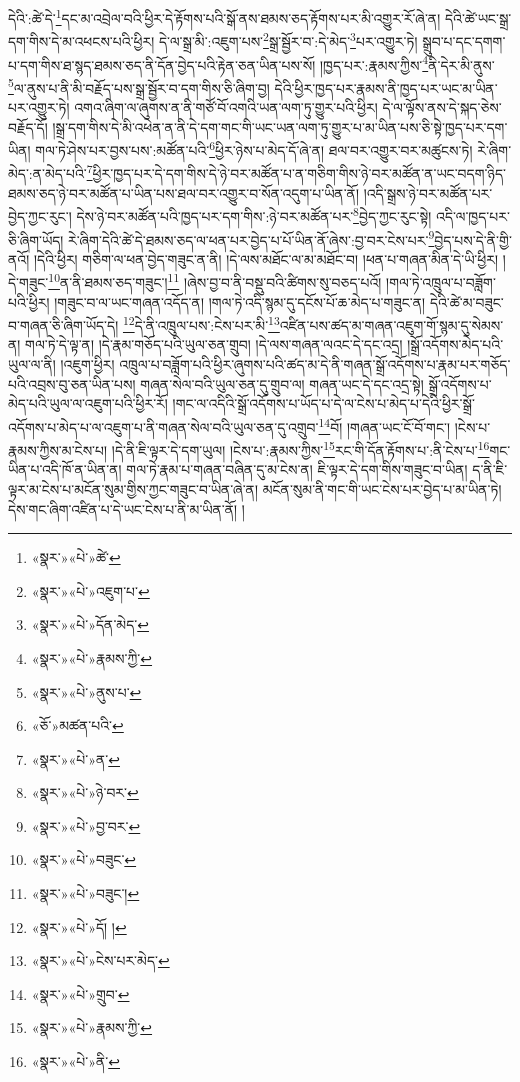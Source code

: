 དེའི་:ཚེ་དེ་\footnote{«སྣར་»«པེ་»ཚེ་}དང་མ་འབྲེལ་བའི་ཕྱིར་དེ་རྟོགས་པའི་སྒོ་ནས་ཐམས་ཅད་རྟོགས་པར་མི་འགྱུར་རོ་ཞེ་ན། དེའི་ཚེ་ཡང་སྒྲ་དག་གིས་དེ་མ་འཕངས་པའི་ཕྱིར། དེ་ལ་སྒྲ་མི་:འཇུག་པས་\footnote{«སྣར་»«པེ་»འཇུག་པ་}སྒྲ་སྦྱོར་བ་:དེ་མེད་\footnote{«སྣར་»«པེ་»དོན་མེད་}པར་འགྱུར་ཏེ། སྒྲུབ་པ་དང་དགག་པ་དག་གིས་ཐ་སྙད་ཐམས་ཅད་ནི་དོན་བྱེད་པའི་རྟེན་ཅན་ཡིན་པས་སོ། །ཁྱད་པར་:རྣམས་ཀྱིས་\footnote{«སྣར་»«པེ་»རྣམས་ཀྱི་}ནི་དེར་མི་ནུས་\footnote{«སྣར་»«པེ་»ནུས་པ་}ལ་ནུས་པ་ནི་མི་བརྗོད་པས་སྒྲ་སྦྱོར་བ་དག་གིས་ཅི་ཞིག་བྱ། དེའི་ཕྱིར་ཁྱད་པར་རྣམས་ནི་ཁྱད་པར་ཡང་མ་ཡིན་པར་འགྱུར་ཏེ། འགའ་ཞིག་ལ་ཞུགས་ན་ནི་གཙོ་བོ་འགའི་ཡན་ལག་ཏུ་གྱུར་པའི་ཕྱིར། དེ་ལ་ལྟོས་ནས་དེ་སྐད་ཅེས་བརྗོད་དོ། །སྒྲ་དག་གིས་དེ་མི་འཕེན་ན་ནི་དེ་དག་གང་གི་ཡང་ཡན་ལག་ཏུ་གྱུར་པ་མ་ཡིན་པས་ཅི་སྟེ་ཁྱད་པར་དག་ཡིན། གལ་ཏེ་ཤེས་པར་བྱས་པས་:མཚོན་པའི་\footnote{«ཅོ་»མཚན་པའི་}ཕྱིར་ཉེས་པ་མེད་དོ་ཞེ་ན། ཐལ་བར་འགྱུར་བར་མཚུངས་ཏེ། རེ་ཞིག་མེད་:ན་མེད་པའི་\footnote{«སྣར་»«པེ་»ན་}ཕྱིར་ཁྱད་པར་དེ་དག་གིས་དེ་ཉེ་བར་མཚོན་པ་ན་གཅིག་གིས་ཉེ་བར་མཚོན་ན་ཡང་བདག་ཉིད་ཐམས་ཅད་ཉེ་བར་མཚོན་པ་ཡིན་པས་ཐལ་བར་འགྱུར་བ་སོན་འདུག་པ་ཡིན་ནོ། །འདི་སྒྲས་ཉེ་བར་མཚོན་པར་བྱེད་ཀྱང་རུང་། དེས་ཉེ་བར་མཚོན་པའི་ཁྱད་པར་དག་གིས་:ཉེ་བར་མཚོན་པར་\footnote{«སྣར་»«པེ་»ཉེ་བར་}བྱེད་ཀྱང་རུང་སྟེ། འདི་ལ་ཁྱད་པར་ཅི་ཞིག་ཡོད། རེ་ཞིག་དེའི་ཚེ་དེ་ཐམས་ཅད་ལ་ཕན་པར་བྱེད་པ་པོ་ཡིན་ནོ་ཞེས་:བྱ་བར་ངེས་པར་\footnote{«སྣར་»«པེ་»བྱ་བར་}བྱེད་པས་དེ་ནི་གྱི་ནའོ། །དེའི་ཕྱིར། གཅིག་ལ་ཕན་བྱེད་གཟུང་ན་ནི། །དེ་ལས་མཐོང་ལ་མ་མཐོང་བ། །ཕན་པ་གཞན་མིན་དེ་ཡི་ཕྱིར། །དེ་གཟུང་\footnote{«སྣར་»«པེ་»བཟུང་}ན་ནི་ཐམས་ཅད་གཟུང་།\footnote{«སྣར་»«པེ་»བཟུང་།} །ཞེས་བྱ་བ་ནི་བསྡུ་བའི་ཚིགས་སུ་བཅད་པའོ། །གལ་ཏེ་འཁྲུལ་པ་བཟློག་པའི་ཕྱིར། །གཟུང་བ་ལ་ཡང་གཞན་འདོད་ན། །གལ་ཏེ་འདི་སྙམ་དུ་དངོས་པོ་ཆ་མེད་པ་གཟུང་ན། དེའི་ཚེ་མ་བཟུང་བ་གཞན་ཅི་ཞིག་ཡོད་དེ། \footnote{«སྣར་»«པེ་»དོ། ། }དེ་ནི་འཁྲུལ་པས་:ངེས་པར་མི་\footnote{«སྣར་»«པེ་»ངེས་པར་མེད་}འཛིན་པས་ཚད་མ་གཞན་འཇུག་གོ་སྙམ་དུ་སེམས་ན། གལ་ཏེ་དེ་ལྟ་ན། །དེ་རྣམ་གཅོད་པའི་ཡུལ་ཅན་གྲུབ། །དེ་ལས་གཞན་ལའང་དེ་དང་འདྲ། །སྒྲོ་འདོགས་མེད་པའི་ཡུལ་ལ་ནི། །འཇུག་ཕྱིར། འཁྲུལ་པ་བཟློག་པའི་ཕྱིར་ཞུགས་པའི་ཚད་མ་དེ་ནི་གཞན་སྒྲོ་འདོགས་པ་རྣམ་པར་གཅོད་པའི་འབྲས་བུ་ཅན་ཡིན་པས། གཞན་སེལ་བའི་ཡུལ་ཅན་དུ་གྲུབ་ལ། གཞན་ཡང་དེ་དང་འདྲ་སྟེ། སྒྲོ་འདོགས་པ་མེད་པའི་ཡུལ་ལ་འཇུག་པའི་ཕྱིར་རོ། །གང་ལ་འདིའི་སྒྲོ་འདོགས་པ་ཡོད་པ་དེ་ལ་ངེས་པ་མེད་པ་དེའི་ཕྱིར་སྒྲོ་འདོགས་པ་མེད་པ་ལ་འཇུག་པ་ནི་གཞན་སེལ་བའི་ཡུལ་ཅན་དུ་འགྲུབ་\footnote{«སྣར་»«པེ་»གྲུབ་}བོ། །གཞན་ཡང་ངོ་བོ་གང་། །ངེས་པ་རྣམས་ཀྱིས་མ་ངེས་པ། །དེ་ནི་ཇི་ལྟར་དེ་དག་ཡུལ། །ངེས་པ་:རྣམས་ཀྱིས་\footnote{«སྣར་»«པེ་»རྣམས་ཀྱི་}རང་གི་དོན་རྟོགས་པ་:ནི་ངེས་པ་\footnote{«སྣར་»«པེ་»ནི་}གང་ཡིན་པ་འདི་ཁོ་ན་ཡིན་ན། གལ་ཏེ་རྣམ་པ་གཞན་བཞིན་དུ་མ་ངེས་ན། ཇི་ལྟར་དེ་དག་གིས་གཟུང་བ་ཡིན། ད་ནི་ཇི་ལྟར་མ་ངེས་པ་མངོན་སུམ་གྱིས་ཀྱང་གཟུང་བ་ཡིན་ཞེ་ན། མངོན་སུམ་ནི་གང་གི་ཡང་ངེས་པར་བྱེད་པ་མ་ཡིན་ཏེ། དེས་གང་ཞིག་འཛིན་པ་དེ་ཡང་ངེས་པ་ནི་མ་ཡིན་ནོ། །
